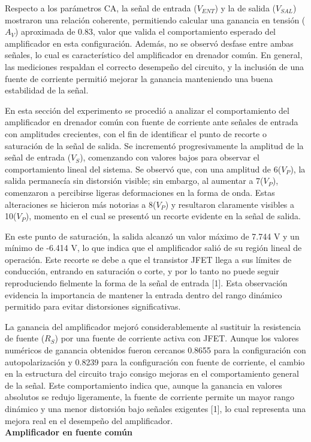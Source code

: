 \documentclass[journal]{IEEEtran}
\begin{document}
	\par Respecto a los parámetros CA, la señal de entrada (\( V_{ENT} \)) y la de salida (\( V_{SAL} \)) mostraron una relación coherente, permitiendo calcular una ganancia en tensión (\( A_V \)) aproximada de 0.83, valor que valida el comportamiento esperado del amplificador en esta configuración. Además, no se observó desfase entre ambas señales, lo cual es característico del amplificador en drenador común. En general, las mediciones respaldan el correcto desempeño del circuito, y la inclusión de una fuente de corriente permitió mejorar la ganancia manteniendo una buena estabilidad de la señal.
	\par En esta sección del experimento se procedió a analizar el comportamiento del amplificador en drenador común con fuente de corriente ante señales de entrada con amplitudes crecientes, con el fin de identificar el punto de recorte o saturación de la señal de salida. Se incrementó progresivamente la amplitud de la señal de entrada (\( V_S \)), comenzando con valores bajos para observar el comportamiento lineal del sistema. Se observó que, con una amplitud de 6(\( V_P \)), la salida permanecía sin distorsión visible; sin embargo, al aumentar a 7(\( V_P \)), comenzaron a percibirse ligeras deformaciones en la forma de onda. Estas alteraciones se hicieron más notorias a 8(\( V_P \)) y resultaron claramente visibles a 10(\( V_P \)), momento en el cual se presentó un recorte evidente en la señal de salida.
	\par En este punto de saturación, la salida alcanzó un valor máximo de 7.744 V y un mínimo de -6.414 V, lo que indica que el amplificador salió de su región lineal de operación. Este recorte se debe a que el transistor JFET llega a sus límites de conducción, entrando en saturación o corte, y por lo tanto no puede seguir reproduciendo fielmente la forma de la señal de entrada [1]. Esta observación evidencia la importancia de mantener la entrada dentro del rango dinámico permitido para evitar distorsiones significativas.
	\par La ganancia del amplificador mejoró considerablemente al sustituir la resistencia de fuente (\( R_S \)) por una fuente de corriente activa con JFET. Aunque los valores numéricos de ganancia obtenidos fueron cercanos 0.8655 para la configuración con autopolarización y 0.8239 para la configuración con fuente de corriente, el cambio en la estructura del circuito trajo consigo mejoras en el comportamiento general de la señal. Este comportamiento indica que, aunque la ganancia en valores absolutos se redujo ligeramente, la fuente de corriente permite un mayor rango dinámico y una menor distorsión bajo señales exigentes [1], lo cual representa una mejora real en el desempeño del amplificador.
	\newline
	\\
	\textbf{Amplificador en fuente común}
	
\end{document}
